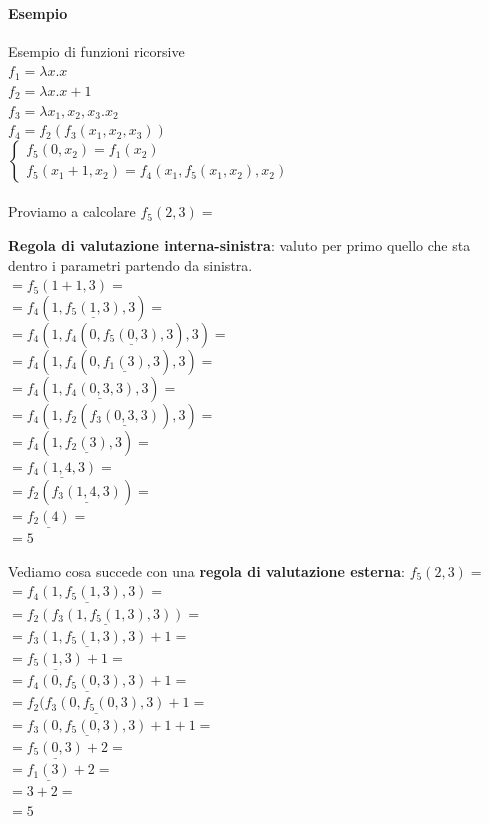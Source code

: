 \documentclass[10pt]{book}
\begin{document}
\paragraph{Esempio} Esempio di funzioni ricorsive\\
$f_1 = \lambda x.x$\\
$f_2 = \lambda x.x+1$\\
$f_3 = \lambda x_1, x_2, x_3. x_2$\\
$f_4 = f_2(f_3(x_1, x_2, x_3))$\\
\begin{math}
		\left\{
		\begin{array}{l}
			f_5(0, x_2) = f_1(x_2)\\
			f_5(x_1 + 1, x_2) = f_4(x_1, f_5(x_1, x_2), x_2)
		\end{array}
		\right.
\end{math}\\\\
Proviamo a calcolare $f_5(2, 3) =$
\begin{multicols}{2}
\textbf{Regola di valutazione interna-sinistra}: valuto per primo quello che sta dentro i parametri partendo da sinistra.\\
$= f_5(1 + 1, 3) =$\\
$= f_4(1, \underline{f_5(1, 3)}, 3) =$\\
$= f_4(1, f_4(0, \underline{f_5(0, 3)}, 3), 3) =$\\$= f_4(1, f_4(0, \underline{f_1(3)}, 3), 3) =$\\
$= f_4(1,\underline{f_4(0, 3, 3)}, 3) =$\\
$= f_4(1, f_2(\underline{f_3(0, 3, 3)}), 3) =$\\
$= f_4(1, \underline{f_2(3)}, 3) =$\\
$= \underline{f_4(1, 4, 3)} =$\\
$= f_2(\underline{f_3(1, 4, 3)}) = $\\
$= \underline{f_2(4)} =$\\
$= 5$\\
\columnbreak

Vediamo cosa succede con una \textbf{regola di valutazione esterna}:
$f_5(2, 3) =$\\
$= \underline{f_4( 1, f_5(1, 3), 3)} =$\\
$= \underline{f_2(f_3(1, f_5(1, 3), 3))} =$\\
$= \underline{f_3(1, f_5(1, 3), 3)} + 1 =$\\
$= \underline{f_5(1, 3)} + 1 =$\\
$= \underline{f_4(0, f_5(0, 3), 3)} + 1 =$\\
$= \underline{f_2(f_3(0, f_5(0, 3), 3)} + 1 = $\\
$= \underline{f_3(0, f_5(0, 3), 3)} + 1 + 1 =$\\
$= \underline{f_5(0, 3)} + 2 =$\\
$= \underline{f_1(3)} + 2 =$\\
$= 3 + 2 =$\\
$= 5$
\end{multicols}
\end{document}
